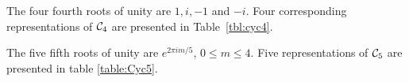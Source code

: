 \begin{example}[$\Cyc_4$]
	The four fourth roots of unity are $1,i,-1$ and $-i$. Four corresponding representations of $\Cyc_4$ are presented in Table~\ref{tbl:cyc4}. %
\end{example}
	
\begin{example}[$\Cyc_5$]
	The five fifth roots of unity are $e^{{2\pi im}/{5}}$, $0 \leq m \leq 4$. Five representations of $\Cyc_5$ are presented in table \ref{table:Cyc5}. %
	
%			
\end{example}



